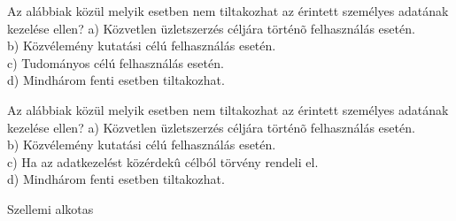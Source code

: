 \begin{frame}

\begin{tcolorbox}[title={179. Kérdés}]
Az alábbiak közül melyik esetben nem tiltakozhat az érintett személyes adatának kezelése ellen?
\tcblower
a) Közvetlen üzletszerzés céljára történõ felhasználás esetén.\\
b) Közvélemény kutatási célú felhasználás esetén.\\
c) Tudományos célú felhasználás esetén.\\
d) Mindhárom fenti esetben tiltakozhat.
\end{tcolorbox}

\begin{tcolorbox}[title={179/A. Kérdés}]
Az alábbiak közül melyik esetben nem tiltakozhat az érintett személyes adatának kezelése ellen?
\tcblower
a) Közvetlen üzletszerzés céljára történõ felhasználás esetén.\\
b) Közvélemény kutatási célú felhasználás esetén.\\
c) Ha az adatkezelést közérdekû célból törvény rendeli el.\\
d) Mindhárom fenti esetben tiltakozhat.
\end{tcolorbox}

\end{frame}

\begin{frame}[plain]
\begin{tcolorbox}[center, colback={myyellow}, coltext={black}, colframe={myyellow}]
    { Szellemi alkotas}\\
\end{tcolorbox}
\end{frame}


